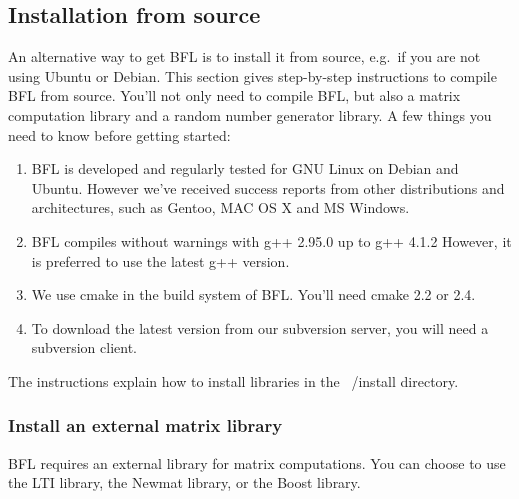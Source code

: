 \documentclass[a4paper,10pt]{article}
\begin{document}
\subsection{Installation from source}
\label{subsec:source}
An alternative way to get BFL is to install it from source, e.g.~if
you are not using Ubuntu or Debian. This section gives step-by-step
instructions to compile BFL from source. You'll not only need to
compile BFL, but also a matrix computation library and a random number
generator library. A few things you need to know before getting
started:
\begin{enumerate}
\item BFL is developed and regularly tested for GNU Linux on
  Debian and Ubuntu. However we've received success reports from other
  distributions and architectures, such as Gentoo, MAC OS X and MS
  Windows.
\item BFL compiles without warnings with g++ 2.95.0 up to g++ 4.1.2
  However, it is preferred to use the latest g++ version.
\item We use cmake in the build system of BFL. You'll need cmake 2.2
  or 2.4.
\item To download the latest version from our subversion server, you
  will need a subversion client.
\end{enumerate}
The instructions explain how to install libraries in the ~/install
directory.

\subsubsection{Install an external matrix library}
\label{subsec:matrix}
BFL requires an external library for matrix computations. You can
choose to use the LTI library, the Newmat library, or the Boost library.
\end{document}
